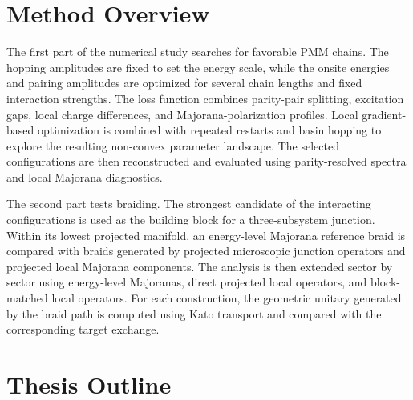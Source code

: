 \section{Method Overview}

The first part of the numerical study searches for favorable PMM chains. The hopping amplitudes are fixed to set the energy scale, while the onsite energies and pairing amplitudes are optimized for several chain lengths and fixed interaction strengths. The loss function combines parity-pair splitting, excitation gaps, local charge differences, and Majorana-polarization profiles. Local gradient-based optimization is combined with repeated restarts and basin hopping to explore the resulting non-convex parameter landscape. The selected configurations are then reconstructed and evaluated using parity-resolved spectra and local Majorana diagnostics.

The second part tests braiding. The strongest candidate of the interacting configurations is used as the building block for a three-subsystem junction. Within its lowest projected manifold, an energy-level Majorana reference braid is compared with braids generated by projected microscopic junction operators and projected local Majorana components. The analysis is then extended sector by sector using energy-level Majoranas, direct projected local operators, and block-matched local operators. For each construction, the geometric unitary generated by the braid path is computed using Kato transport and compared with the corresponding target exchange.


\section{Thesis Outline}

